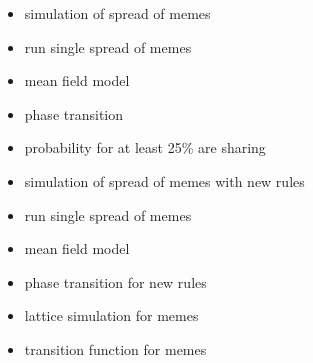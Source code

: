 \documentclass[12pt]{article}
\begin{document}
\singlespacing
\begin{itemize}

\item{\large simulation of spread of memes}

\vspace{1cm}

\item{\large run single spread of memes }

\vspace{1cm}

\item{\large mean field model}

\vspace{1cm}

\item{\large phase transition}

\vspace{1cm}


\item{\large probability for at least 25\% are sharing}

\vspace{1cm}


\item{\large simulation of spread of memes with new rules}

\vspace{1cm}

\item{\large run single spread of memes }

\vspace{1cm}

\item{\large mean field model}

\vspace{1cm}

\item{\large phase transition for new rules}

\vspace{1cm}

\item{\large lattice simulation for memes}

\vspace{1cm}

\item{\large transition function for memes}

\vspace{1cm}


\end{itemize}
\end{document}
